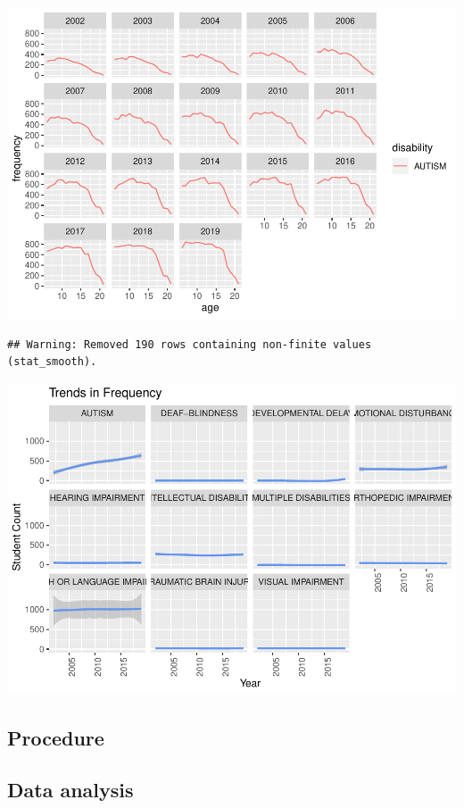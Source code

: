 \documentclass[
  english,
  man]{apa6}
\begin{document}
\includegraphics{draft_play_files/figure-latex/unnamed-chunk-2-1.pdf}

\begin{verbatim}
## Warning: Removed 190 rows containing non-finite values (stat_smooth).
\end{verbatim}

\includegraphics{draft_play_files/figure-latex/unnamed-chunk-3-1.pdf}

\hypertarget{procedure}{%
\subsection{Procedure}\label{procedure}}

\hypertarget{data-analysis}{%
\subsection{Data analysis}\label{data-analysis}}
\end{document}
